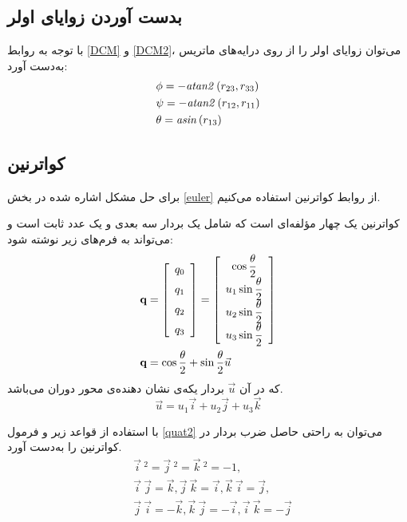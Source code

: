 \subsection{بدست آوردن زوایای اولر}
با توجه به روابط \eqref{DCM} و \eqref{DCM2}،  می‌توان زوایای اولر را از روی درایه‌های ماتریس به‌دست آورد:
\begin{equation} \label{زوایای اولر}
\begin{split}
& \phi=-{\it atan2} \left( r_{23},r_{33} \right) \\
& \psi=-{\it atan2} \left( r_{12},r_{11} \right) \\
& \theta={\it asin} \left( r_{13} \right) 
\end{split}
\end{equation}
\subsection{کواترنین}
برای حل مشکل اشاره شده در بخش \ref{euler} از روابط کواترنین استفاده می‌کنیم.

کواترنین یک چهار مؤلفه‌ای است که شامل یک بردار سه بعدی و یک عدد ثابت است و می‌تواند به فرم‌های زیر نوشته شود:
\begin{subequations}
\begin{align}
 & \textbf{q}= \left[ \begin {array}{c} q_{{0}}\\ \noalign{\medskip}q_{{1}}
\\ \noalign{\medskip}q_{{2}}\\ \noalign{\medskip}q_{{3}}\end {array}
 \right]=
 \left[\begin{array}{c}
\cos{\dfrac{\theta}{2}}\\
u_1\sin{\dfrac{\theta}{2}}\\
u_2\sin{\dfrac{\theta}{2}}\\
u_3\sin{\dfrac{\theta}{2}}
\end{array}\right] \label{quat1}\\
& \textbf{q}=\cos{\dfrac{\theta}{2}}+\sin{\dfrac{\theta}{2}}\vec{u} \label{quat2}
\end{align}
\end{subequations}
که در آن $ \vec u $ بردار یکه‌ی نشان دهنده‌ی محور دوران می‌باشد.
\begin{equation}
\vec{u}=u_1\vec{i}+u_2\vec{j}+u_3\vec{k}
\end{equation}
\begin{lemma} \label{lem}
با استفاده از قواعد زیر و فرمول \eqref{quat2} می‌توان به راحتی حاصل ضرب بردار در کواترنین را به‌دست آورد. 
\begin{equation}
\begin{split}
&\vec{i} \ ^{2}=\vec{j} \ ^{2}=\vec{k} \ ^{2}=-1,\\
&\vec{i} \ \vec{j}=\vec{k},\vec{j} \ \vec{k}=\vec{i},\vec{k} \ \vec{i}=\vec{j},\\
&\vec{j} \ \vec{i}=-\vec{k},\vec{k} \ \vec{j}=-\vec{i},\vec{i} \ \vec{k}=-\vec{j}
\end{split}
\end{equation}
\end{lemma}
